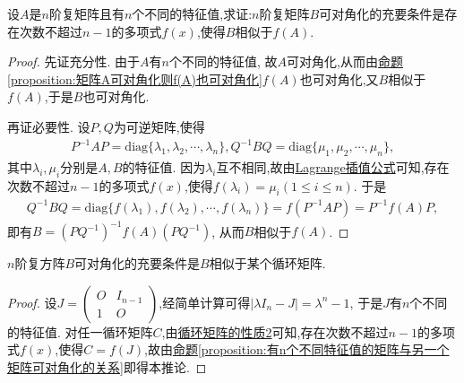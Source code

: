 \documentclass[../../main.tex]{subfiles}%
\begin{document}
\begin{proposition}\label{proposition:有n个不同特征值的矩阵与另一个矩阵可对角化的关系}
设$A$是$n$阶复矩阵且有$n$个不同的特征值,求证:$n$阶复矩阵$B$可对角化的充要条件是存在次数不超过$n - 1$的多项式$f(x)$,使得$B$相似于$f(A)$.
\end{proposition}
\begin{proof}

先证充分性. 由于$A$有$n$个不同的特征值, 故$A$可对角化,从而由\hyperref[proposition:矩阵A可对角化则f(A)也可对角化]{命题\ref{proposition:矩阵A可对角化则f(A)也可对角化}}$f(A)$也可对角化,又$B$相似于$f(A)$,于是$B$也可对角化. 

再证必要性. 设$P,Q$为可逆矩阵,使得
\begin{align*}
P^{-1}AP=\mathrm{diag}\{\lambda_1,\lambda_2,\cdots,\lambda_n\}, Q^{-1}BQ=\mathrm{diag}\{\mu_1,\mu_2,\cdots,\mu_n\},
\end{align*}
其中$\lambda_i,\mu_i$分别是$A,B$的特征值. 因为$\lambda_i$互不相同,故由\hyperref[theorem:Lagrange插值公式]{Lagrange插值公式}可知,存在次数不超过$n - 1$的多项式$f(x)$,使得$f(\lambda_i)=\mu_i(1\leqslant  i\leqslant  n)$. 于是
\begin{align*}
Q^{-1}BQ=\mathrm{diag}\{f(\lambda_1),f(\lambda_2),\cdots,f(\lambda_n)\}=f(P^{-1}AP)=P^{-1}f(A)P,
\end{align*}
即有$B=(PQ^{-1})^{-1}f(A)(PQ^{-1})$, 从而$B$相似于$f(A)$. 

\end{proof}

\begin{corollary}\label{corollary:}
$n$阶复方阵$B$可对角化的充要条件是$B$相似于某个循环矩阵.
\end{corollary}
\begin{proof}

设$J=\begin{pmatrix}O&I_{n - 1}\\1&O\end{pmatrix}$,经简单计算可得$|\lambda I_n - J|=\lambda^n - 1$, 于是$J$有$n$个不同的特征值. 对任一循环矩阵$C$,由\hyperref[proposition:循环矩阵的性质]{循环矩阵的性质2}可知,存在次数不超过$n - 1$的多项式$f(x)$,使得$C = f(J)$,故由\hyperref[proposition:有n个不同特征值的矩阵与另一个矩阵可对角化的关系]{命题\ref{proposition:有n个不同特征值的矩阵与另一个矩阵可对角化的关系}}即得本推论.

\end{proof}
\end{document}
